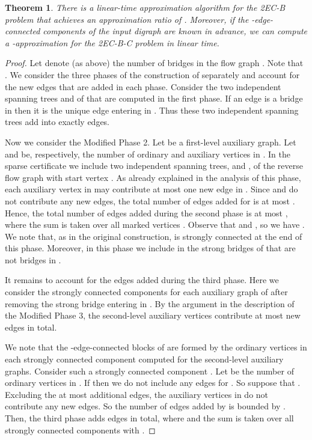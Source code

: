 \documentclass[11pt]{article}
\newtheorem{theorem}{Theorem}[section]
\begin{document}
\begin{theorem}
\label{theorem:ApproximationRatio}
There is a linear-time approximation algorithm for the \textsf{2EC-B} problem that achieves an approximation ratio of .
Moreover, if the -edge-connected components of the input digraph are known in advance, we can compute a -approximation for the \textsf{2EC-B-C} problem in linear time.
\end{theorem}
\begin{proof}
Let  denote (as above)  the number of bridges in the flow graph . Note that .
We consider the three phases of the construction of  separately and account for the new edges that are added in each phase.
Consider the two independent spanning trees  and  of  that are computed in the first phase. If an edge  is a bridge in  then it is the unique edge entering  in . Thus these two independent spanning trees add into  exactly  edges.

Now we consider the Modified Phase 2. Let  be a first-level auxiliary graph. Let  and  be, respectively, the number of ordinary and auxiliary vertices in .
In the sparse certificate we include two independent spanning trees,  and , of the reverse flow graph  with start vertex .
As already explained in the analysis of this phase, each auxiliary vertex  in  may contribute at most one new edge in .
Since  and  do not contribute any new edges, the total number of edges added for  is at most . Hence, the total number of edges added during the second phase is at most , where the sum is taken over all  marked vertices . Observe that  and , so we have .
We note that, as in the original construction,  is strongly connected at the end of this phase. Moreover, in this phase we include in  the strong bridges of  that are not bridges in .

It remains to account for the edges added during the third phase.
Here we consider the strongly connected components for each auxiliary graph  of  after removing the strong bridge entering  in .
By the argument in the description of the Modified Phase 3, the second-level auxiliary vertices contribute at most  new edges in total.

We note that the -edge-connected blocks of  are formed by the ordinary vertices in each strongly connected component computed for the second-level auxiliary graphs.
Consider such a strongly connected component . Let  be the number of ordinary vertices in . If  then we do not include any edges for . So suppose that .
Excluding the at most  additional edges, the auxiliary vertices in  do not contribute any new edges. So the number of edges added by  is bounded by .
Then, the third phase adds  edges in total, where  and the sum is taken over all strongly connected components with .


\end{proof}
\end{document}
